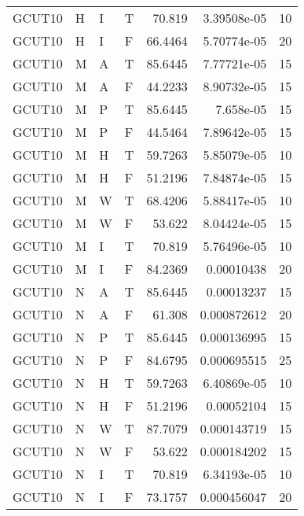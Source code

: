 \begin{longtable}{llllrrr}
    GCUT10   & H     & I     & T          & 70.819     & 3.39508e-05 & 10       \\
    GCUT10   & H     & I     & F          & 66.4464    & 5.70774e-05 & 20       \\
    GCUT10   & M     & A     & T          & 85.6445    & 7.77721e-05 & 15       \\
    GCUT10   & M     & A     & F          & 44.2233    & 8.90732e-05 & 15       \\
    GCUT10   & M     & P     & T          & 85.6445    & 7.658e-05   & 15       \\
    GCUT10   & M     & P     & F          & 44.5464    & 7.89642e-05 & 15       \\
    GCUT10   & M     & H     & T          & 59.7263    & 5.85079e-05 & 10       \\
    GCUT10   & M     & H     & F          & 51.2196    & 7.84874e-05 & 15       \\
    GCUT10   & M     & W     & T          & 68.4206    & 5.88417e-05 & 10       \\
    GCUT10   & M     & W     & F          & 53.622     & 8.04424e-05 & 15       \\
    GCUT10   & M     & I     & T          & 70.819     & 5.76496e-05 & 10       \\
    GCUT10   & M     & I     & F          & 84.2369    & 0.00010438  & 20       \\
    GCUT10   & N     & A     & T          & 85.6445    & 0.00013237  & 15       \\
    GCUT10   & N     & A     & F          & 61.308     & 0.000872612 & 20       \\
    GCUT10   & N     & P     & T          & 85.6445    & 0.000136995 & 15       \\
    GCUT10   & N     & P     & F          & 84.6795    & 0.000695515 & 25       \\
    GCUT10   & N     & H     & T          & 59.7263    & 6.40869e-05 & 10       \\
    GCUT10   & N     & H     & F          & 51.2196    & 0.00052104  & 15       \\
    GCUT10   & N     & W     & T          & 87.7079    & 0.000143719 & 15       \\
    GCUT10   & N     & W     & F          & 53.622     & 0.000184202 & 15       \\
    GCUT10   & N     & I     & T          & 70.819     & 6.34193e-05 & 10       \\
    GCUT10   & N     & I     & F          & 73.1757    & 0.000456047 & 20       \\

\end{longtable}
